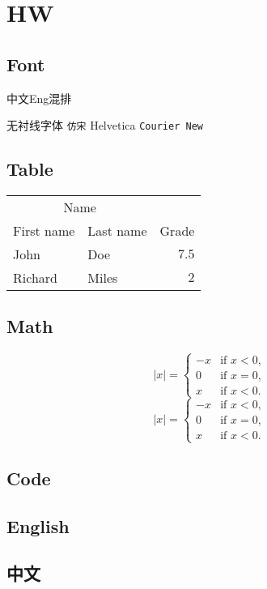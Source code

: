 \chapter{HW}
\section{Font}
中文Eng混排\par
\textsf{无衬线字体} \texttt{仿宋} \textsf{Helvetica} \texttt{Courier New}\\
\section{Table}
\begin{table}[H]
    \centering
    \begin{tabular}{llr}
        \toprule
        \multicolumn{2}{c}{Name} \\
        \cmidrule(r){1-2}
        First name & Last name & Grade \\
        \midrule
        John & Doe & $7.5$ \\
        \midrule
        Richard & Miles & $2$\\
        \bottomrule
    \end{tabular}
\end{table}
\section{Math}
\[ |x| = \left\{\begin{array}{rl}
    -x & \text{if }x<0,\\
    0 & \text{if }x=0,\\
    x & \text{if }x<0.
    \end{array} \right. \]
    \[ |x| = \begin{cases}
    -x & \text{if }x<0,\\
    0 & \text{if }x=0,\\
    x & \text{if }x<0.
    \end{cases} \]
\section{Code}

\section{English}
\lipsum[1-3]
\section{中文}
\zhlipsum[3-4]